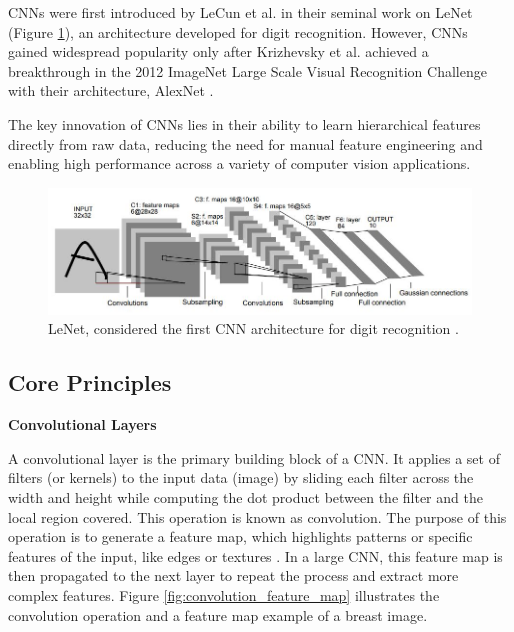 \documentclass[a4paper,10pt]{book}
\begin{document}
CNNs were first introduced by LeCun et al. \cite{lecun_gradient-based_1998} in their seminal work on LeNet (Figure \ref{fig:lenet}), an architecture developed for digit recognition. However, CNNs gained widespread popularity only after Krizhevsky et al. achieved a breakthrough in the 2012 ImageNet Large Scale Visual Recognition Challenge with their architecture, AlexNet \cite{NIPS2012_c399862d}.

The key innovation of CNNs lies in their ability to learn hierarchical features directly from raw data, reducing the need for manual feature engineering and enabling high performance across a variety of computer vision applications.


\begin{figure}[h!]
    \centering
    \includegraphics[width=0.8\linewidth]{reports//assets/lenet.jpg}
    \caption[LeNet CNN]{LeNet, considered the first CNN architecture for digit recognition \cite{lecun_gradient-based_1998}.}
    \label{fig:lenet}
\end{figure}


\subsection{Core Principles}

\textbf{Convolutional Layers}

A convolutional layer is the primary building block of a CNN. It applies a set of filters (or kernels) to the input data (image) by sliding each filter across the width and height while computing the dot product between the filter and the local region covered. This operation is known as convolution. The purpose of this operation is to generate a feature map, which highlights patterns or specific features of the input, like edges or textures \cite{noauthor_what_2021}. In a large CNN, this feature map is then propagated to the next layer to repeat the process and extract more complex features. Figure \ref{fig:convolution_feature_map} illustrates the convolution operation and a feature map example of a breast image.
\end{document}

